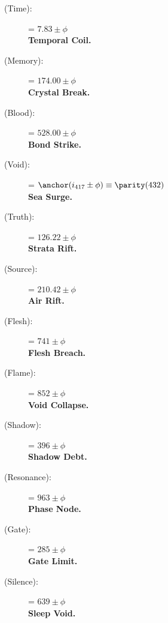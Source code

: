 \begin{description}
    \item[\FETU{} (Time):] \fetudrah = $7.83\pm\phi$\, \\
    \textbf{Temporal Coil.}

    \item[\KAL{} (Memory):] \kalzhil = $174.00\pm\phi$\, \\
    \textbf{Crystal Break.}

    \item[\BABDH{} (Blood):] \babdhtir = $528.00\pm\phi$\, \\
    \textbf{Bond Strike.}

    \item[\AHN{} (Void):] \ahnkha = $\anchor({i_{417}} \pm\phi) \equiv\parity (432)$\, \\
    \textbf{Sea Surge.}

    \item[\VEL{} (Truth):] \velirn = $126.22\pm\phi$\, \\
    \textbf{Strata Rift.}

    \item[\SOR{} (Source):] \soryon = $210.42\pm\phi$\, \\
    \textbf{Air Rift.}

    \item[\KOTH{} (Flesh):] \kothrhun = $741\pm\phi$\, \\
    \textbf{Flesh Breach.}

    \item[\DREH{} (Flame):] \drehizh = $852\pm\phi$\, \\
    \textbf{Void Collapse.}

    \item[\RHEA{} (Shadow):] \rheafral = $396\pm\phi$\, \\
    \textbf{Shadow Debt.}

    \item[\ZHEK{} (Resonance):] \zheknod = $963\pm\phi$\, \\
    \textbf{Phase Node.}

    \item[\SHAV{} (Gate):] \shavlimh = $285\pm\phi$\, \\
    \textbf{Gate Limit.}

    \item[\TRIG{} (Silence):] \trigslun = $639\pm\phi$\, \\
    \textbf{Sleep Void.}
\end{description}

